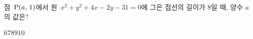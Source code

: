 점~$\mathrm{P}(a,\,1)$에서 원~$x^2+y^2+4x-2y-31=0$에 그은 접선의 길이가 $8$일 때, 양수 $a$의 값은?
\begin{choices32}{$6$}{$7$}{$8$}{$9$}{$10$}\end{choices32}

